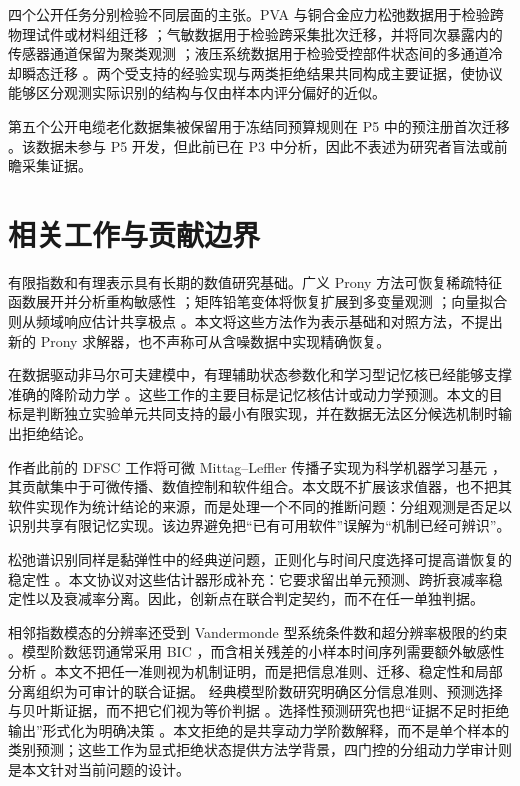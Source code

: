 \documentclass[UTF8,11pt]{ctexart}
\begin{document}
四个公开任务分别检验不同层面的主张。PVA 与铜合金应力松弛数据用于检验跨物理试件或材料组迁移 \cite{schelkow2026pva,kupferdigital2024relaxation}；气敏数据用于检验跨采集批次迁移，并将同次暴露内的传感器通道保留为聚类观测 \cite{ziyatdinov2015dataset,ziyatdinov2015bioinspired}；液压系统数据用于检验受控部件状态间的多通道冷却瞬态迁移 \cite{helwig2018hydraulic}。两个受支持的经验实现与两类拒绝结果共同构成主要证据，使协议能够区分观测实际识别的结构与仅由样本内评分偏好的近似。

第五个公开电缆老化数据集被保留用于冻结同预算规则在 P5 中的预注册首次迁移 \cite{kayanja2026cableageing}。该数据未参与 P5 开发，但此前已在 P3 中分析，因此不表述为研究者盲法或前瞻采集证据。

\section{相关工作与贡献边界}
有限指数和有理表示具有长期的数值研究基础。广义 Prony 方法可恢复稀疏特征函数展开并分析重构敏感性 \cite{stampfer2020gop}；矩阵铅笔变体将恢复扩展到多变量观测 \cite{bosner2021parallel}；向量拟合则从频域响应估计共享极点 \cite{gustavsen1999vector}。本文将这些方法作为表示基础和对照方法，不提出新的 Prony 求解器，也不声称可从含噪数据中实现精确恢复。

在数据驱动非马尔可夫建模中，有理辅助状态参数化和学习型记忆核已经能够支撑准确的降阶动力学 \cite{lei2016parameterization,ge2024state,lang2026learning}。这些工作的主要目标是记忆核估计或动力学预测。本文的目标是判断独立实验单元共同支持的最小有限实现，并在数据无法区分候选机制时输出拒绝结论。

作者此前的 DFSC 工作将可微 Mittag--Leffler 传播子实现为科学机器学习基元 \cite{hu2026dfsc}，其贡献集中于可微传播、数值控制和软件组合。本文既不扩展该求值器，也不把其软件实现作为统计结论的来源，而是处理一个不同的推断问题：分组观测是否足以识别共享有限记忆实现。该边界避免把“已有可用软件”误解为“机制已经可辨识”。

松弛谱识别同样是黏弹性中的经典逆问题，正则化与时间尺度选择可提高谱恢复的稳定性 \cite{stankiewicz2023relaxation}。本文协议对这些估计器形成补充：它要求留出单元预测、跨折衰减率稳定性以及衰减率分离。因此，创新点在联合判定契约，而不在任一单独判据。

相邻指数模态的分辨率还受到 Vandermonde 型系统条件数和超分辨率极限的约束 \cite{moitra2015superresolution}。模型阶数惩罚通常采用 BIC \cite{schwarz1978bic}，而含相关残差的小样本时间序列需要额外敏感性分析 \cite{hurvich1989timeseries}。本文不把任一准则视为机制证明，而是把信息准则、迁移、稳定性和局部分离组织为可审计的联合证据。
经典模型阶数研究明确区分信息准则、预测选择与贝叶斯证据，而不把它们视为等价判据 \cite{stoica2004modelorder,shao1993crossvalidation,kass1995bayes}。选择性预测研究也把“证据不足时拒绝输出”形式化为明确决策 \cite{geifman2017selective}。本文拒绝的是共享动力学阶数解释，而不是单个样本的类别预测；这些工作为显式拒绝状态提供方法学背景，四门控的分组动力学审计则是本文针对当前问题的设计。
\end{document}
